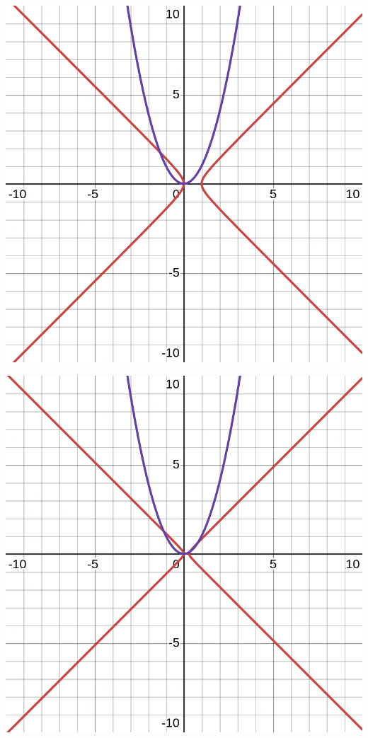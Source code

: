 \documentclass{article}
\begin{document}
\includegraphics[width=\linewidth]{conic_pic_1.png}

\includegraphics[width=\linewidth]{conic_pic_2.png}
\end{document}
